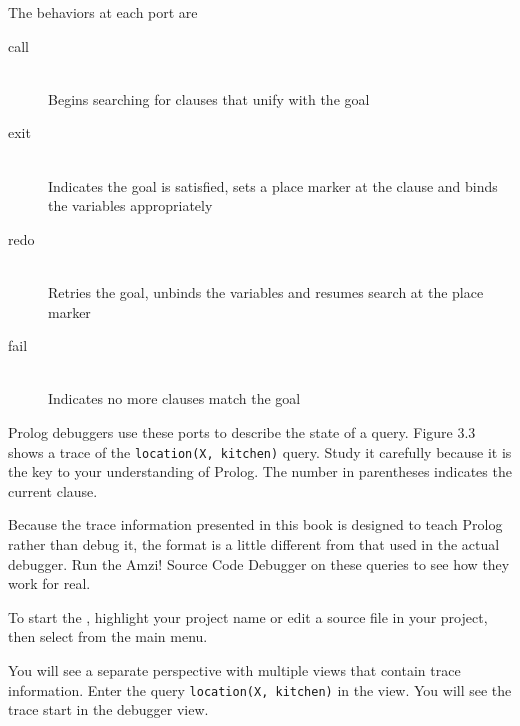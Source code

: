 \noindent
The behaviors at each port are
\begin{description}
\item[call]\ \\Begins searching for clauses that unify with the goal
\item[exit]\ \\Indicates the goal is satisfied, sets a place marker at the
clause and binds the variables appropriately
\item[redo]\ \\Retries the goal, unbinds the variables and resumes search at the
place marker
\item[fail]\ \\Indicates no more clauses match the goal
\end{description}

Prolog debuggers use these ports to describe the state of a query. Figure 3.3
shows a trace of the \verb'location(X, kitchen)' query. Study it carefully
because it is the key to your understanding of Prolog. The number in parentheses
indicates the current clause.


Because the trace information presented in this book is designed to teach Prolog
rather than debug it, the format is a little different from that used in the
actual debugger. Run the Amzi! Source Code Debugger on these queries to see how
they work for real.

To start the , highlight your project name or edit a source
file in your project, then select 
from the main menu.

You will see a separate perspective with multiple views that contain trace
information. Enter the query \verb'location(X, kitchen)' in the  view. You will see the trace start in the debugger view.



\secup
